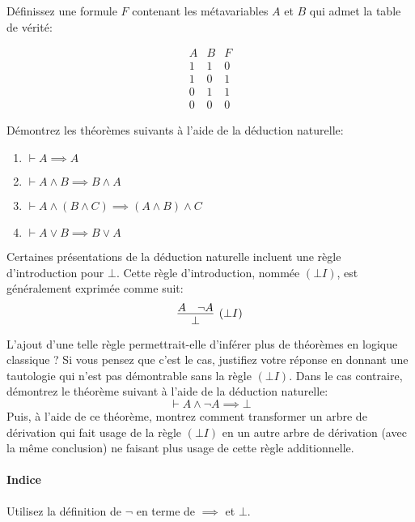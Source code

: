 \documentclass[12pt,french,a4paper]{article}
\begin{document}
\vspace{1cm}

\begin{question}
Définissez une formule $F$ contenant les métavariables $A$ et $B$ qui admet la table de vérité:

\begin{displaymath}
\begin{array}{cc|c}
A & B & F\\
\hline
1 & 1 & 0\\
1 & 0 & 1\\
0 & 1 & 1\\
0 & 0 & 0
\end{array}
\end{displaymath}

\end{question}

\vspace{1cm}

\begin{question}
Démontrez les théorèmes suivants à l'aide de la déduction naturelle:
\begin{enumerate}
\item $\vdash A \implies A$
\item $\vdash A \wedge B \implies B \wedge A$
\item $\vdash A \wedge (B \wedge C) \implies (A \wedge B) \wedge C$
\item $\vdash A \vee B \implies B \vee A$
\end{enumerate}
\end{question}

\newpage

\begin{question}
Certaines présentations de la déduction naturelle incluent une règle d'introduction pour $\bot$.
Cette règle d'introduction, nommée $({\bot}I)$, est généralement exprimée comme suit:
\[
\infer[({\bot}I)]{\bot}{A & \neg A}
\]

\vspace{1cm}

L'ajout d'une telle règle permettrait-elle d'inférer plus de théorèmes en logique classique ?
Si vous pensez que c'est le cas, justifiez votre réponse en donnant une tautologie qui n'est pas démontrable sans la règle $({\bot}I)$.
Dans le cas contraire, démontrez le théorème suivant à l'aide de la déduction naturelle:
\[
\vdash A \wedge \neg A \implies \bot
\]
Puis, à l'aide de ce théorème, montrez comment transformer un arbre de dérivation qui fait usage de la règle $({\bot}I)$ en un autre arbre de dérivation (avec la même conclusion) ne faisant plus usage de cette règle additionnelle.

\paragraph{Indice} Utilisez la définition de ${\neg}$ en terme de ${\implies}$ et $\bot$.

\end{question}
\end{document}

